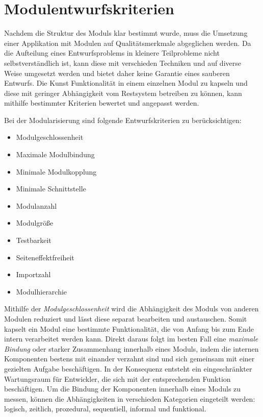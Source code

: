   \section{Modulentwurfskriterien} \label{sec:MEK}
    Nachdem die Struktur des Moduls klar bestimmt wurde, muss die Umsetzung einer Applikation mit Modulen auf Qualitätsmerkmale abgeglichen werden. Da die Aufteilung eines Entwurfsproblems in kleinere Teilprobleme nicht selbstverständlich ist, kann diese mit verschieden Techniken und auf diverse Weise umgesetzt werden und bietet daher keine Garantie eines sauberen Entwurfs. Die Kunst Funktionalität in einem einzelnen Modul zu kapseln und diese mit geringer Abhängigkeit vom Restsystem betreiben zu können, kann mithilfe bestimmter Kriterien bewertet und angepasst werden. \cite{softModDes,softMdDes2,modulMitJava9,java9modRevealed,modulProgJava9}\bigbreak
    
    Bei der Modularisierung sind folgende Entwurfskriterien zu berücksichtigen: 
    \begin{itemize}
      \item Modulgeschlossenheit 
      \item Maximale Modulbindung 
      \item Minimale Modulkopplung 
      \item Minimale Schnittstelle 
      \item Modulanzahl 
      \item Modulgröße 
      \item Testbarkeit 
      \item Seiteneffektfreiheit 
      \item Importzahl 
      \item Modulhierarchie 
    \end{itemize}
    Mithilfe der \textit{Modulgeschlossenheit} wird die Abhängigkeit des Moduls von anderen Modulen reduziert und lässt diese separat bearbeiten und austauschen. Somit kapselt ein Modul eine bestimmte Funktionalität, die von Anfang bis zum Ende intern verarbeitet werden kann. Direkt daraus folgt im besten Fall eine \textit{maximale Bindung} oder starker Zusammenhang innerhalb eines Moduls, indem die internen Komponenten bestens mit einander verzahnt sind und sich gemeinsam mit einer gezielten Aufgabe beschäftigen. In der Konsequenz entsteht ein eingeschränkter Wartungsraum für Entwickler, die sich mit der entsprechenden Funktion beschäftigen. Um die Bindung der Komponenten innerhalb eines Moduls zu messen, können die Abhängigkeiten in verschieden Kategorien eingeteilt werden: logisch, zeitlich, prozedural, sequentiell, informal und funktional.

